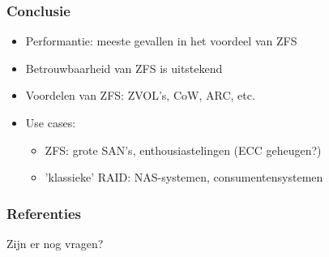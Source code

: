\documentclass{beamer}
\begin{document}
\begin{frame}[fragile]
  \frametitle{Conclusie}
  \begin{itemize}
    \item Performantie: meeste gevallen in het voordeel van ZFS
    \item Betrouwbaarheid van ZFS is uitstekend
    \item Voordelen van ZFS: ZVOL's, CoW, ARC, etc.
    \item Use cases:
    \begin{itemize}
      \item ZFS: grote SAN's, enthousiastelingen (ECC geheugen?)
      \item 'klassieke' RAID: NAS-systemen, consumentensystemen
    \end{itemize}
  \end{itemize}
\end{frame}



\begin{frame}[allowframebreaks]
  \frametitle{Referenties}
  \printbibliography
\end{frame}


\begin{frame}
\Huge{\centerline{Zijn er nog vragen?}}
\end{frame}

\end{document}
